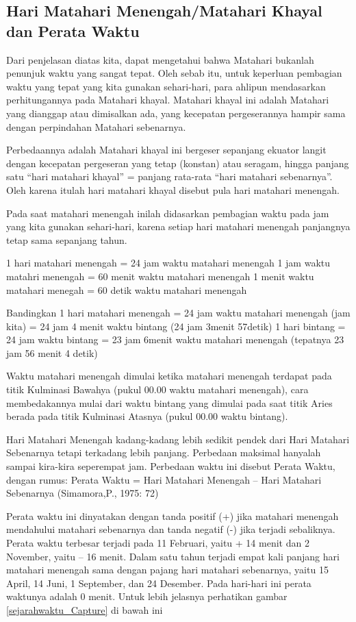 \subsection{Hari Matahari Menengah/Matahari Khayal dan Perata Waktu}
 Dari penjelasan diatas kita, dapat mengetahui bahwa Matahari bukanlah penunjuk 
 waktu yang sangat tepat. Oleh sebab itu, untuk keperluan pembagian waktu yang tepat
 yang kita gunakan sehari-hari, para ahlipun mendasarkan perhitungannya pada Matahari
 khayal. Matahari khayal ini adalah Matahari yang dianggap atau dimisalkan ada, 
 yang kecepatan pergeserannya hampir sama dengan perpindahan Matahari sebenarnya.
 
 Perbedaannya adalah Matahari khayal ini bergeser sepanjang ekuator langit 
 dengan kecepatan pergeseran yang tetap (konstan) atau seragam, hingga panjang satu
 “hari matahari khayal” = panjang rata-rata “hari matahari sebenarnya”. 
 Oleh karena itulah hari matahari khayal disebut pula hari matahari menengah.
 
  Pada saat matahari menengah inilah didasarkan pembagian waktu pada jam yang kita gunakan sehari-hari, karena setiap hari matahari menengah panjangnya tetap sama sepanjang tahun.

	1 hari matahari menengah = 24 jam waktu matahari menengah 
	1 jam waktu matahri menengah = 60 menit waktu matahari menengah
	1 menit waktu matahari menegah = 60 detik waktu matahari menengah
	
	Bandingkan
	1 hari matahari menengah = 24 jam waktu matahari menengah (jam kita)
							 = 24 jam 4 menit waktu bintang (24 jam 3menit 57detik)
	1 hari bintang		     = 24 jam waktu bintang
							 = 23 jam 6menit waktu matahari menengah 
							  (tepatnya 23 jam 56 menit 4 detik)
								  
Waktu matahari menengah dimulai ketika matahari menengah terdapat pada titik
 Kulminasi Bawahya (pukul 00.00 waktu matahari menengah), cara membedakannya mulai 
 dari waktu bintang yang dimulai pada saat titik Aries berada
 pada titik Kulminasi Atasnya (pukul 00.00 waktu bintang).


Hari Matahari Menengah kadang-kadang lebih sedikit pendek dari Hari Matahari 
 Sebenarnya tetapi terkadang lebih panjang.   Perbedaan maksimal hanyalah 
 sampai kira-kira seperempat jam. Perbedaan waktu ini disebut Perata Waktu, 
 dengan rumus:
				Perata Waktu = Hari Matahari Menengah – Hari Matahari Sebenarnya
							(Simamora,P., 1975: 72)
								
Perata waktu ini dinyatakan dengan tanda positif (+) jika 
 matahari menengah mendahului matahari sebenarnya dan tanda negatif (-)
 jika terjadi sebaliknya. Perata waktu terbesar terjadi pada 11 Februari,
 yaitu + 14 menit dan 2 November, yaitu – 16 menit. Dalam satu tahun terjadi 
 empat kali panjang hari matahari menengah sama dengan pajang hari matahari sebenarnya,
 yaitu 15 April, 14 Juni, 1 September, dan 24 Desember. Pada hari-hari ini perata 
 waktunya adalah 0 menit.  Untuk lebih jelasnya perhatikan gambar \ref{sejarahwaktu_Capture} di bawah ini								
	
